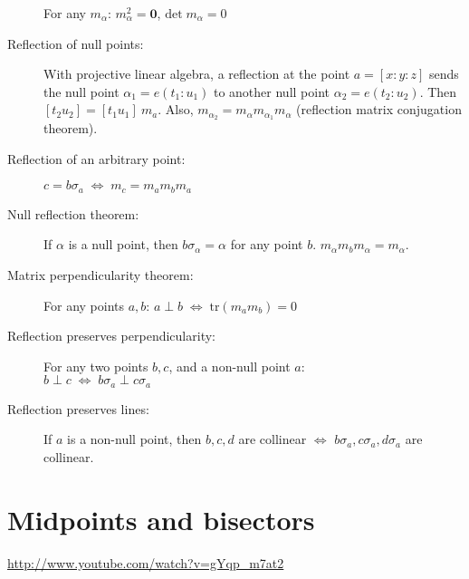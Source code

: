 \documentclass[DIV16,halfparskip]{scrartcl}
\newcommand{\C}{\!\!:\!\!}
\begin{document}
\begin{description}
        For any $m_\alpha$: $m_\alpha^2 = \mathbf{0}$, $\mathrm{det}\;m_\alpha = 0$

    \item [Reflection of null points:] With projective linear algebra, a
        reflection at the point $a=[x\C y\C z]$ sends the null point
        $\alpha_1=e(t_1\C u_1)$ to another null point $\alpha_2=e(t_2\C u_2)$.
        Then $[t_2 u_2] = [t_1 u_1]\: m_a$. Also, $m_{\alpha_2} = m_\alpha
        m_{\alpha_1} m_\alpha$ (reflection matrix conjugation theorem).

    \item [Reflection of an arbitrary point:] 
        $c=b\sigma_a \;\Leftrightarrow\; m_c = m_a m_b m_a$

    \item [Null reflection theorem:]
        If $\alpha$ is a null point, then $b\sigma_\alpha = \alpha$ for any
        point $b$. $m_\alpha m_b m_\alpha = m_\alpha$.

    \item [Matrix perpendicularity theorem:]
        For any points $a, b$: \(a\perp b \;\Leftrightarrow\; \mathrm{tr}(m_am_b) = 0 \)

    \item [Reflection preserves perpendicularity:] For any two points $b, c$,
        and a non-null point $a$:\\
        \(b\perp c \;\Leftrightarrow\; b\sigma_a \perp c\sigma_a\)

    \item [Reflection preserves lines:] If $a$ is a non-null point, then $b, c,
        d$ are collinear $\Leftrightarrow$ $b\sigma_a, c\sigma_a, d\sigma_a$
        are collinear.
\end{description}

\section{Midpoints and bisectors}
\url{http://www.youtube.com/watch?v=gYqp_m7at2}
\end{document}
